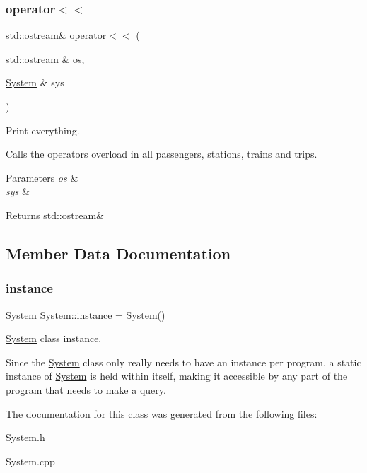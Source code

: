 \subsubsection{\texorpdfstring{operator$<$$<$}{operator<<}}
{\footnotesize\ttfamily std\+::ostream\& operator$<$$<$ (\begin{DoxyParamCaption}\item[{std\+::ostream \&}]{os,  }\item[{\mbox{\hyperlink{classSystem}{System}} \&}]{sys }\end{DoxyParamCaption})\hspace{0.3cm}{\ttfamily [friend]}}



Print everything. 

Calls the operators overload in all passengers, stations, trains and trips.


\begin{DoxyParams}{Parameters}
{\em os} & \\
\hline
{\em sys} & \\
\hline
\end{DoxyParams}
\begin{DoxyReturn}{Returns}
std\+::ostream\& 
\end{DoxyReturn}


\subsection{Member Data Documentation}
\mbox{\label{classSystem_a40d348884d1b737ecd26b4bc6509bf48}} 
\subsubsection{\texorpdfstring{instance}{instance}}
{\footnotesize\ttfamily \mbox{\hyperlink{classSystem}{System}} System\+::instance = \mbox{\hyperlink{classSystem}{System}}()\hspace{0.3cm}{\ttfamily [static]}}



\mbox{\hyperlink{classSystem}{System}} class instance. 

Since the \mbox{\hyperlink{classSystem}{System}} class only really needs to have an instance per program, a static instance of \mbox{\hyperlink{classSystem}{System}} is held within itself, making it accessible by any part of the program that needs to make a query. 

The documentation for this class was generated from the following files\+:\begin{DoxyCompactItemize}
\item 
System.\+h\item 
System.\+cpp\end{DoxyCompactItemize}
